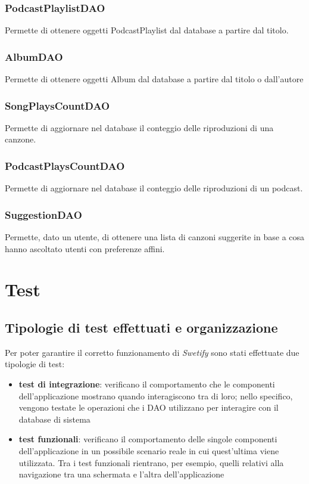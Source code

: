 \documentclass{article}
\begin{document}
  \subsubsection{PodcastPlaylistDAO}
  Permette di ottenere oggetti PodcastPlaylist dal database a partire dal titolo.

  \subsubsection{AlbumDAO}
  Permette di ottenere oggetti Album dal database a partire dal titolo o dall'autore

  \subsubsection{SongPlaysCountDAO}
  Permette di aggiornare nel database il conteggio delle riproduzioni di una canzone.

  \subsubsection{PodcastPlaysCountDAO}
  Permette di aggiornare nel database il conteggio delle riproduzioni di un podcast.

  \subsubsection{SuggestionDAO}
  Permette, dato un utente, di ottenere una lista di canzoni suggerite in base a cosa hanno ascoltato utenti con preferenze affini.


  \section{Test}

  \subsection{Tipologie di test effettuati e organizzazione}

  Per poter garantire il corretto funzionamento di \textit{Swetify} sono stati effettuate due tipologie di test:
  \begin{itemize}
    \item \textbf{test di integrazione}: verificano il comportamento che le componenti dell'applicazione mostrano quando interagiscono tra di loro; nello specifico, vengono testate le operazioni che i DAO utilizzano per interagire con il database di sistema
    \item \textbf{test funzionali}: verificano il comportamento delle singole componenti dell'applicazione in un possibile scenario reale in cui quest'ultima viene utilizzata. Tra i test funzionali rientrano, per esempio, quelli relativi alla navigazione tra una schermata e l'altra dell'applicazione
  \end{itemize}
\end{document}
